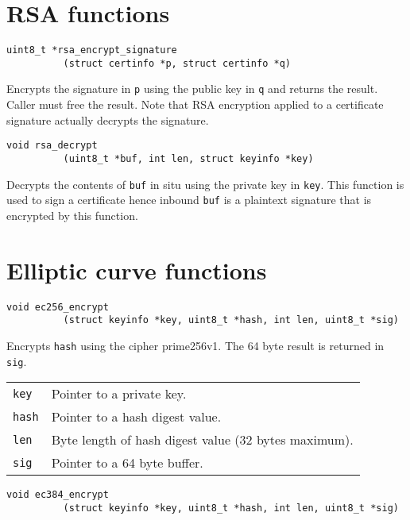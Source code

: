 \documentclass[12pt]{article}
\begin{document}
\tableofcontents

\newpage
\section{RSA functions}

\bigskip
\bigskip
\begin{verbatim}
uint8_t *rsa_encrypt_signature
          (struct certinfo *p, struct certinfo *q)
\end{verbatim}

\noindent
Encrypts the signature in {\tt p} using the public key in {\tt q} and returns the result.
Caller must free the result.
Note that RSA encryption applied to a certificate signature actually decrypts the signature.

\bigskip
\bigskip
\begin{verbatim}
void rsa_decrypt
          (uint8_t *buf, int len, struct keyinfo *key)
\end{verbatim}

\noindent
Decrypts the contents of {\tt buf} in situ using the private key in {\tt key}.
This function is used to sign a certificate hence inbound {\tt buf} is a
plaintext signature that is encrypted by this function.

\newpage
\section{Elliptic curve functions}

\bigskip
\bigskip
\begin{verbatim}
void ec256_encrypt
          (struct keyinfo *key, uint8_t *hash, int len, uint8_t *sig)
\end{verbatim}

\noindent
Encrypts {\tt hash} using the cipher prime256v1.
The 64 byte result is returned in {\tt sig}.

\bigskip
\begin{tabular}{ll}
{\tt key} & Pointer to a private key.\\
{\tt hash} & Pointer to a hash digest value.\\
{\tt len} & Byte length of hash digest value (32 bytes maximum).\\
{\tt sig} & Pointer to a 64 byte buffer.
\end{tabular}

\bigskip
\bigskip
\begin{verbatim}
void ec384_encrypt
          (struct keyinfo *key, uint8_t *hash, int len, uint8_t *sig)
\end{verbatim}
\end{document}
